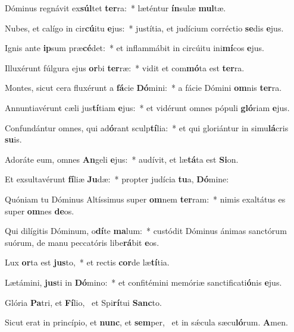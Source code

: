 \item Dóminus regnávit ex\textbf{súl}tet \textbf{ter}ra:~* læténtur \textbf{ín}sulæ \textbf{mul}tæ.
\item Nubes, et calígo in cir\textbf{cú}itu \textbf{e}jus:~* justítia, et judícium corréctio \textbf{se}dis \textbf{e}jus.
\item Ignis ante \textbf{ip}sum præ\textbf{cé}det:~* et inflammábit in circúitu ini\textbf{mí}cos \textbf{e}jus.
\item Illuxérunt fúlgura ejus \textbf{or}bi \textbf{ter}ræ:~* vidit et com\textbf{mó}ta est \textbf{ter}ra.
\item Montes, sicut cera fluxérunt a \textbf{fá}cie \textbf{Dó}mini:~* a fácie Dómini \textbf{om}nis \textbf{ter}ra.
\item Annuntiavérunt cæli jus\textbf{tí}tiam \textbf{e}jus:~* et vidérunt omnes pópuli \textbf{gló}riam \textbf{e}jus.
\item Confundántur omnes, qui ad\textbf{ó}rant sculp\textbf{tí}lia:~* et qui gloriántur in simu\textbf{lá}cris \textbf{su}is.
\item Adoráte eum, omnes \textbf{An}geli \textbf{e}jus:~* audívit, et læ\textbf{tá}ta est \textbf{Si}on.
\item Et exsultavérunt \textbf{fí}liæ \textbf{Ju}dæ:~* propter judícia \textbf{tu}a, \textbf{Dó}mine:
\item Quóniam tu Dóminus Altíssimus super \textbf{om}nem \textbf{ter}ram:~* nimis exaltátus es super \textbf{om}nes \textbf{de}os.
\item Qui dilígitis Dóminum, o\textbf{dí}te \textbf{ma}lum:~* custódit Dóminus ánimas sanctórum suórum, de manu peccatóris libe\textbf{rá}bit \textbf{e}os.
\item Lux \textbf{or}ta est \textbf{jus}to,~* et rectis \textbf{cor}de læ\textbf{tí}tia.
\item Lætámini, \textbf{jus}ti in \textbf{Dó}mino:~* et confitémini memóriæ sanctificati\textbf{ó}nis \textbf{e}jus.
\item Glória \textbf{Pa}tri, et \textbf{Fí}lio,~\psstar{} et Spi\textbf{rí}tui \textbf{Sanc}to.
\item Sicut erat in princípio, et \textbf{nunc}, et \textbf{sem}per,~\psstar{} et in sǽcula sæcu\textbf{ló}rum. \textbf{A}men.

